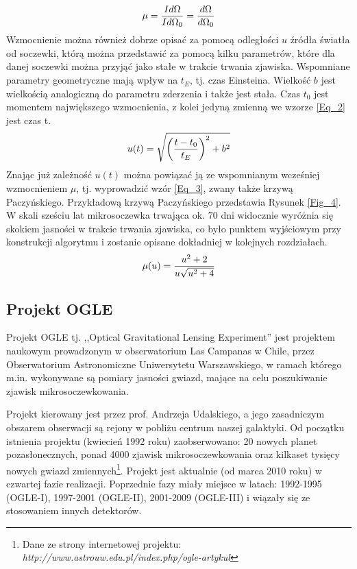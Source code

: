 \documentclass[a4paper,11pt]{article}
\newcommand{\ak}{\hspace{0.7 cm}}
\begin{document}
\begin{equation}
\centering
\mu=\frac{Id\Omega}{Id\Omega_{0}}=\frac{d\Omega}{d\Omega_{0}}
\label{Eq_1}
\end{equation}
\flushleft
\ak Wzmocnienie można również dobrze opisać za pomocą odległości $u$ źródła światła od soczewki, którą można przedstawić za pomocą kilku parametrów, które dla danej soczewki można przyjąć jako stałe w trakcie trwania zjawiska. Wspomniane parametry geometryczne mają wpływ na $t_{E}$, tj. czas Einsteina. Wielkość $b$ jest wielkością analogiczną do parametru zderzenia i także jest stała. Czas $t_{0}$ jest momentem największego wzmocnienia, z kolei jedyną zmienną we wzorze \ref{Eq_2} jest czas {t}.
\begin{equation}
\centering
u(t)=\sqrt{\left(\frac{t-t_{0}}{t_{E}}\right)^{2}+b^{2}}
\label{Eq_2}
\end{equation}
\ak Znając już zależność $u(t)$ można powiązać ją ze wspomnianym wcześniej wzmocnieniem $\mu$, tj. wyprowadzić wzór \ref{Eq_3}, zwany także krzywą Paczyńskiego. Przykładową krzywą Paczyńskiego przedstawia Rysunek \ref{Fig_4}.
W skali sześciu lat mikrosoczewka trwająca ok. $70$ dni widocznie wyróżnia się skokiem jasności w trakcie trwania zjawiska, co było punktem wyjściowym przy konstrukcji algorytmu i zostanie opisane dokładniej w kolejnych rozdziałach.
\begin{equation}
\centering
\mu(u)=\frac{u^{2}+2}{u\sqrt{u^{2}+4}}
\label{Eq_3}
\end{equation}
\flushleft
\subsection{Projekt OGLE}

\ak Projekt OGLE  tj. ,,Optical Gravitational Lensing Experiment'' jest projektem naukowym prowadzonym w obserwatorium Las Campanas w Chile, przez Obserwatorium Astronomiczne Uniwersytetu Warszawskiego, w ramach którego m.in. wykonywane są pomiary jasności gwiazd, mające na celu poszukiwanie zjawisk mikrosoczewkowania. 

\ak Projekt kierowany jest przez prof. Andrzeja Udalskiego, a jego zasadniczym obszarem obserwacji są rejony w pobliżu centrum naszej galaktyki. Od początku istnienia projektu (kwiecień 1992 roku) zaobserwowano: 20 nowych planet pozasłonecznych, ponad 4000 zjawisk mikrosoczewkowania oraz kilkaset tysięcy nowych gwiazd zmiennych\footnote{Dane ze strony internetowej projektu: \textit{http://www.astrouw.edu.pl/index.php/ogle-artykul}}. Projekt jest aktualnie (od marca 2010 roku) w czwartej fazie realizacji. Poprzednie fazy miały miejsce w latach: 1992-1995 (OGLE-I), 1997-2001 (OGLE-II), 2001-2009 (OGLE-III) i wiązały się ze stosowaniem innych detektorów.
 
\end{document}
